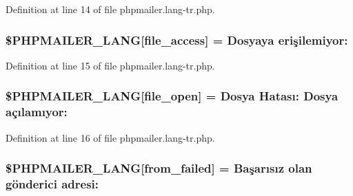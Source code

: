 Definition at line 14 of file phpmailer.\+lang-\/tr.\+php.

\subsubsection[{\texorpdfstring{\$\+P\+H\+P\+M\+A\+I\+L\+E\+R\+\_\+\+L\+A\+NG}{$PHPMAILER_LANG}}]{\setlength{\rightskip}{0pt plus 5cm}\$P\+H\+P\+M\+A\+I\+L\+E\+R\+\_\+\+L\+A\+NG\mbox{[}\textquotesingle{}file\+\_\+access\textquotesingle{}\mbox{]} = \textquotesingle{}Dosyaya erişilemiyor\+: \textquotesingle{}}\hypertarget{phpmailer_8lang-tr_8php_a7e83349023b856ef9e5c46e30ae6d51e}{}\label{phpmailer_8lang-tr_8php_a7e83349023b856ef9e5c46e30ae6d51e}


Definition at line 15 of file phpmailer.\+lang-\/tr.\+php.

\subsubsection[{\texorpdfstring{\$\+P\+H\+P\+M\+A\+I\+L\+E\+R\+\_\+\+L\+A\+NG}{$PHPMAILER_LANG}}]{\setlength{\rightskip}{0pt plus 5cm}\$P\+H\+P\+M\+A\+I\+L\+E\+R\+\_\+\+L\+A\+NG\mbox{[}\textquotesingle{}file\+\_\+open\textquotesingle{}\mbox{]} = \textquotesingle{}Dosya Hatası\+: Dosya açılamıyor\+: \textquotesingle{}}\hypertarget{phpmailer_8lang-tr_8php_a28d1a6517bf4c942a0ddd506188ad2e0}{}\label{phpmailer_8lang-tr_8php_a28d1a6517bf4c942a0ddd506188ad2e0}


Definition at line 16 of file phpmailer.\+lang-\/tr.\+php.

\subsubsection[{\texorpdfstring{\$\+P\+H\+P\+M\+A\+I\+L\+E\+R\+\_\+\+L\+A\+NG}{$PHPMAILER_LANG}}]{\setlength{\rightskip}{0pt plus 5cm}\$P\+H\+P\+M\+A\+I\+L\+E\+R\+\_\+\+L\+A\+NG\mbox{[}\textquotesingle{}from\+\_\+failed\textquotesingle{}\mbox{]} = \textquotesingle{}Başarısız olan gönderici adresi\+: \textquotesingle{}}\hypertarget{phpmailer_8lang-tr_8php_adf832ae12155a09be077c6d5e4fd7e22}{}\label{phpmailer_8lang-tr_8php_adf832ae12155a09be077c6d5e4fd7e22}


